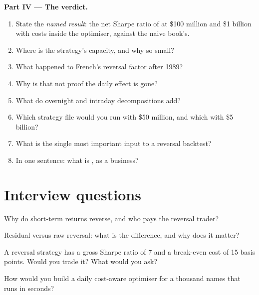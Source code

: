 \begin{problem}
\medskip\noindent\textbf{Part IV --- The verdict.}
\begin{enumerate}[resume]
\item State the \emph{named result}: the net Sharpe ratio of  at \$100 million and \$1 billion with costs inside the optimiser, against the
naive book's.
\item Where is the strategy's capacity, and why so small?
\item What happened to French's reversal factor after 1989?
\item Why is that not proof the daily effect is gone?
\item What do overnight and intraday decompositions add?
\item Which strategy file would you run with \$50 million, and which with \$5 billion?
\item What is the single most important input to a reversal backtest?
\item In one sentence: what is , as a business?
\end{enumerate}
\end{problem}

\section{Interview questions}

\begin{interviewq}\label{iq:s1:short-term-reversal:1}
Why do short-term returns reverse, and who pays the reversal trader?
\end{interviewq}

\begin{interviewq}\label{iq:s1:short-term-reversal:2}
Residual versus raw reversal: what is the difference, and why does it matter?
\end{interviewq}

\begin{interviewq}\label{iq:s1:short-term-reversal:3}
A reversal strategy has a gross Sharpe ratio of 7 and a break-even cost of 15 basis points. Would you trade it? What would you ask?
\end{interviewq}

\begin{interviewq}\label{iq:s1:short-term-reversal:4}
How would you build a daily cost-aware optimiser for a thousand names that runs in seconds?
\end{interviewq}

